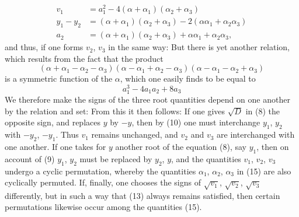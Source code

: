 \[
\begin{aligned}
v_1 &= a_1^2 - 4(\alpha+\alpha_1)(\alpha_2+\alpha_3)\\
y_1-y_2 &= (\alpha+\alpha_1)(\alpha_2+\alpha_3) - 2(\alpha\alpha_1+\alpha_2\alpha_3)\\
a_2 &= (\alpha+\alpha_1)(\alpha_2+\alpha_3) + \alpha\alpha_1 + \alpha_2\alpha_3,
\end{aligned}
\]
and thus, if one forms $v_2$, $v_3$ in the same way:
But there is yet another relation, which results from the fact that the product
\[
(\alpha+\alpha_1-\alpha_2-\alpha_3)(\alpha-\alpha_1+\alpha_2-\alpha_3)(\alpha-\alpha_1-\alpha_2+\alpha_3)
\]
is a symmetric function of the $\alpha$, which one easily finds to be equal to
\[
a_1^3 - 4a_1a_2 + 8a_3
\]
We therefore make the signs of the three root quantities depend on one another by the relation
and set:
From this it then follows:
If one gives $\sqrt{D}$ in (8) the opposite sign, and replaces $y$ by $-y$, then by (10) one must interchange $y_1$, $y_2$ with $-y_2$, $-y_1$. Thus $v_1$ remains unchanged, and $v_2$ and $v_3$ are interchanged with one another. If one takes for $y$ another root of the equation (8), say $y_1$, then on account of (9) $y_1$, $y_2$ must be replaced by $y_2$, $y$, and the quantities $v_1$, $v_2$, $v_3$ undergo a cyclic permutation, whereby the quantities $\alpha_1$, $\alpha_2$, $\alpha_3$ in (15) are also cyclically permuted. If, finally, one chooses the signs of $\sqrt{v_1}$, $\sqrt{v_2}$, $\sqrt{v_3}$ differently, but in such a way that (13) always remains satisfied, then certain permutations likewise occur among the quantities (15).

